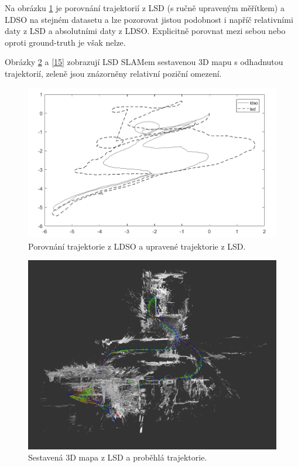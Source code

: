 \documentclass[12pt,a4paper]{report}
\begin{document}
Na obrázku \ref{13} je porovnání trajektorií z LSD (s ručně upraveným měřítkem) a LDSO na stejném datasetu a lze pozorovat jistou podobnost i napříč relativními daty z LSD a absolutními daty z LDSO. Explicitně porovnat mezi sebou nebo oproti ground-truth je však nelze.

Obrázky \ref{14} a \ref{15} zobrazují LSD SLAMem sestavenou 3D mapu s odhadnutou trajektorií, zeleně jsou znázorněny relativní poziční omezení.

\begin{figure}[H]
\centering
\includegraphics[scale=0.63]{img/porov_lsd_ldso.png}
\caption{Porovnání trajektorie z LDSO a upravené trajektorie z LSD.}
\label{13}
\end{figure} 

\begin{figure}[H]
\centering
\includegraphics[scale=0.455]{img/LSD_11_top.png}
\caption{Sestavená 3D mapa z LSD a proběhlá trajektorie.}
\label{14}
\end{figure} 
\end{document}
